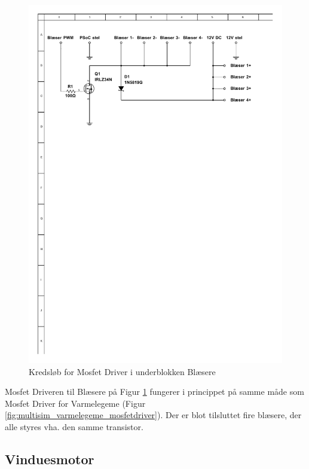 \clearpage
 
\begin{figure}[h]
\centering 
\includegraphics[width={\textwidth}, trim= 40 550 70 70, clip=true] {../fig/multisim_blaesere_mosfetdriver.pdf}
\caption{Kredsløb for Mosfet Driver i underblokken Blæsere}
\label{fig:multisim_blaesere_mosfetdriver}
\end{figure}

Mosfet Driveren til Blæsere på Figur \ref{fig:multisim_blaesere_mosfetdriver} fungerer i princippet på samme måde som Mosfet Driver for Varmelegeme (Figur \ref{fig:multisim_varmelegeme_mosfetdriver}).
Der er blot tilsluttet fire blæsere, der alle styres vha. den samme transistor. 

\clearpage


\subsection{Vinduesmotor}

